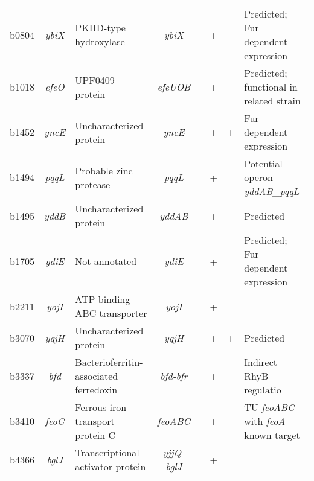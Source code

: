 \begin{sidewaystable}
\begin{scriptsize}
\begin{tabular}{ l c >{\raggedright}p{4cm} c c c 
>{\centering\arraybackslash}p{1.2cm} >{\raggedright\arraybackslash}p{4cm} }
	b0804 & \textit{ybiX} & PKHD-type hydroxylase 		& \textit{ybiX} & 
	  & + 	& 	& Predicted; Fur dependent expression \\[1ex]
	  
	b1018 & \textit{efeO} & UPF0409 protein 		& \textit{efeUOB} & 
	  & + 	& 	& Predicted; functional in related strain \\[1ex]
	  
	b1452 & \textit{yncE} & Uncharacterized protein & \textit{yncE} & 
	  & + 	& + & Fur dependent expression \\[1ex]
	  
	b1494 & \textit{pqqL} & Probable zinc protease 	& \textit{pqqL} & 
	  & + 	& 	& Potential operon \textit{yddAB\_pqqL} \\[1ex]
	  
	b1495 & \textit{yddB} & Uncharacterized protein & \textit{yddAB} & 
	  & + 	&	& Predicted \\[1ex]
	  
	b1705 & \textit{ydiE} & Not annotated 			& \textit{ydiE} & 
	  & + 	& 	& Predicted; Fur dependent expression \\[1ex]
	  
	b2211 & \textit{yojI} & ATP-binding ABC transporter & \textit{yojI} & 
	  & + 	& 	& \\[1ex]
	  
	b3070 & \textit{yqjH} & Uncharacterized protein & \textit{yqjH} & 
	  & + 	& + & Predicted \\[1ex]
	  
	b3337 & \textit{bfd} & Bacterioferritin-associated ferredoxin & 
	\textit{bfd-bfr} & 
	  & + 	& 	& Indirect RhyB regulatio \\[1ex]
	  
	b3410 & \textit{feoC} & Ferrous iron transport protein C & \textit{feoABC} 
	& 
	  & + 	& 	& TU \textit{feoABC} with \textit{feoA} known target \\[1ex]
	  
	b4366 & \textit{bglJ} & Transcriptional activator protein & 
	\textit{yjjQ-bglJ} & 
	  & + 	& 	& \\[1ex]
	\bottomrule
\end{tabular}
\end{scriptsize}
\end{sidewaystable}





